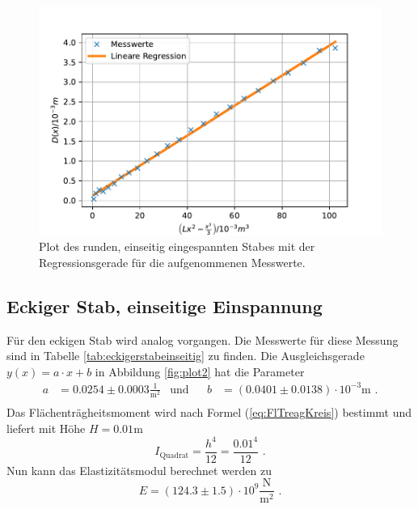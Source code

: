 \begin{figure}[H]
  \centering
  \includegraphics{pictures/Lineare Regression1.pdf}
  \caption{Plot des runden, einseitig eingespannten Stabes mit der Regressionsgerade für die aufgenommenen Messwerte.}
  \label{fig:plot1}
\end{figure}

\subsection{Eckiger Stab, einseitige Einspannung}

Für den eckigen Stab wird analog vorgangen.
Die Messwerte für diese Messung sind in Tabelle \ref{tab:eckigerstabeinseitig} zu finden.
Die Ausgleichsgerade $y(x) = a \cdot x + b$ in Abbildung \ref{fig:plot2} hat die Parameter
\begin{align*}
  a &= 0.0254 ± 0.0003 \frac{1}{\unit{\meter\squared}} & \text{und}& & b&= (0.0401 ± 0.0138) \cdot 10^{-3} \unit\meter \text{ .} \\
\end{align*}
Das Flächenträgheitsmoment wird nach Formel (\ref{eq:FlTreagKreis}) bestimmt und liefert mit Höhe $H = 0.01 \unit\meter$
\begin{equation*}
  I_\text{Quadrat} = \frac{h^4} {12} = \frac{0.01^4} {12} \text{ .}
\end{equation*}
Nun kann das Elastizitätsmodul berechnet werden zu
\begin{equation*}
  E = (124.3 \pm 1.5) \cdot 10^{9} \frac{\unit\newton}{\unit\meter^2} \text{ .}
\end{equation*}


